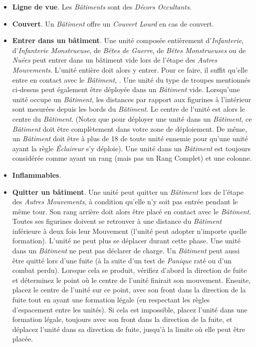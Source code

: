 \begin{itemize}[label={-}]
\item \textbf{Ligne de vue}. Les \emph{Bâtiments} sont des \emph{Décors Occultants}.
\item \textbf{Couvert}. Un \emph{Bâtiment} offre un \emph{Couvert Lourd} en cas de couvert.
\item \textbf{Entrer dans un bâtiment}. Une unité composée entièrement d'\emph{Infanterie}, d'\emph{Infanterie Monstrueuse}, de \emph{Bêtes de Guerre}, de \emph{Bêtes Monstrueuses} ou de \emph{Nuées} peut entrer dans un bâtiment vide lors de l'étape des \emph{Autres Mouvements}. L'unité entière doit alors y entrer. Pour ce faire, il suffit qu'elle entre en contact avec le \emph{Bâtiment}, . Une unité du type de troupes mentionnés ci-dessus peut également être déployée dans un \emph{Bâtiment} vide. Lorsqu'une unité occupe un \emph{Bâtiment}, les distances par rapport aux figurines à l'intérieur sont mesurées depuis les bords du \emph{Bâtiment}. Le centre de l'unité est alors le centre du \emph{Bâtiment}. (Notez que pour déployer une unité dans un \emph{Bâtiment}, ce \emph{Bâtiment} doit être complètement dans votre zone de déploiement. De même, un \emph{Bâtiment} doit être à plus de \unit{18}{\pouce} de toute unité ennemie pour qu'une unité ayant la règle \emph{Éclaireur} s'y déploie). Une unité dans un \emph{Bâtiment} est toujours considérée comme ayant un rang (mais pas un Rang Complet) et une colonne.
\item \textbf{Inflammables}. 
\item \textbf{Quitter un bâtiment}. Une unité peut quitter un \emph{Bâtiment} lors de l'étape des \emph{Autres Mouvements}, à condition qu'elle n'y soit pas entrée pendant le même tour. Son rang arrière doit alors être placé en contact avec le \emph{Bâtiment}. Toutes ses figurines doivent se retrouver à une distance du \emph{Bâtiment} inférieure à deux fois leur Mouvement (l'unité peut adopter n'importe quelle formation). L'unité ne peut plus se déplacer durant cette phase. Une unité dans un \emph{Bâtiment} ne peut pas déclarer de charge. Un \emph{Bâtiment} peut aussi être quitté lors d'une fuite (à la suite d'un test de \emph{Panique} raté ou d'un combat perdu). Lorsque cela se produit, vérifiez d'abord la direction de fuite et déterminez le point où le centre de l’unité finirait son mouvement. Ensuite, placez le centre de l'unité sur ce point, avec son front dans la direction de la fuite tout en ayant une formation légale (en respectant les règles d'espacement entre les unités). Si cela est impossible, placez l'unité dans une formation légale, toujours avec son front dans la direction de la fuite, et déplacez l'unité dans sa direction de fuite, jusqu'à la limite où elle peut être placée.

\end{itemize}
